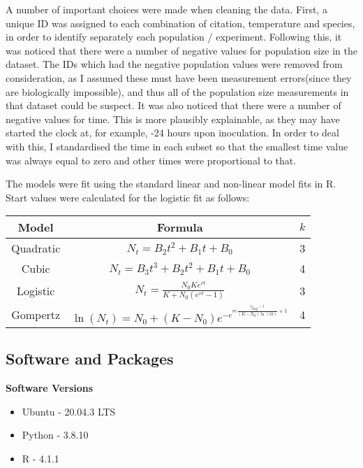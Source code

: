\documentclass[11pt,a4wide,titlepage]{article}
\begin{document}
A number of important choices were made when cleaning the data. First, a unique ID was assigned to each combination of citation, temperature and species, in order to identify separately each population / experiment. Following this, it was noticed that there were a number of negative values for population size in the dataset. The IDs which had the negative population values were removed from consideration, as I assumed these must have been measurement errors(since they are biologically impossible), and thus all of the population size measurements in that dataset could be suspect. It was also noticed that there were a number of negative values for time. This is more plausibly explainable, as they may have started the clock at, for example, -24 hours upon inoculation. In order to deal with this, I standardised the time in each subset so that the smallest time value was always equal to zero and other times were proportional to that.



The models were fit using the standard linear and non-linear model fits in R. Start values were calculated for the logistic fit as follows: 



\begin{center}
	\def\arraystretch{2}
	\begin{tabular}{|c|c|c|}
		\hline
		Model & Formula & $k$\\
		\hline
		Quadratic & $N_t = B_2t^2 + B_1t + B_0$ & 3\\
		Cubic & $N_t = B_3t^3 + B_2t^2 + B_1t + B_0$ & 4\\
		Logistic & $N_t = \frac{N_0Ke^{rt}}{K + N_0(e^{rt} - 1)}$ & 3\\[2ex]
		Gompertz & $\ln(N_t) = N_0 + (K - N_0)e^{-e^{re\frac{t_{lag} - t}{(K - N_0)\ln(10)} + 1}}$ & 4\\[2ex]
		\hline
	\end{tabular}
\end{center}



\subsection*{Software and Packages}
\textbf{Software Versions}
\begin{itemize}
    \item Ubuntu - 20.04.3 LTS
    \item Python - 3.8.10
    \item R - 4.1.1
\end{itemize}
\end{document}
